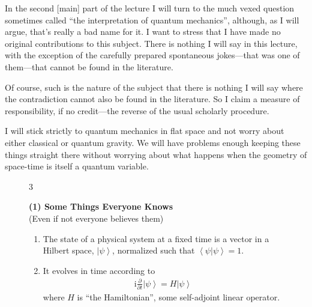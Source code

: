\documentclass[12pt,nofootinbib]{revtex4}
\newcommand{\braket}[2]{\left\langle #1 | #2 \right\rangle}
\newcommand{\ket}[1]{\left|#1\right\rangle}
\renewcommand{\i}{\text{i}}
\begin{document}
In the second [main] part of the lecture I will turn to the much vexed question sometimes called ``the interpretation of quantum mechanics'', although, as I will argue, that's really a bad name for it. I want to stress that I have made no original contributions to this subject. There is nothing I will say in this lecture, with the exception of the carefully prepared spontaneous jokes---that was one of them---that cannot be found in the literature.

Of course, such is the nature of the subject that there is nothing I will say where the contradiction cannot also be found in the literature. So I claim a measure of responsibility, if no credit---the reverse of the usual scholarly procedure.

I will stick strictly to quantum mechanics in flat space and not worry about either classical or quantum gravity. We will have problems enough keeping these things straight there without worrying about what happens when the geometry of space-time is itself a quantum variable.

\begin{figure}[htb] 
\begin{mdframed}
  \vspace{5pt}\hfill 3\\[-18pt]
  \begin{center}
    \textbf{(1) Some Things Everyone Knows}\\[4pt]
    (Even if not everyone believes them)
  \end{center}
  \begin{enumerate}[label=(\roman*)]
  \item The state of a physical system at a fixed time is a vector in a Hilbert space, $\ket{\psi}$, normalized such that $\braket{\psi}{\psi}=1$.
  \item It evolves in time according to
    \begin{align}
      \nonumber
      \i\frac{\partial}{\partial t}\ket{\psi} = H\ket{\psi}
    \end{align}
    where $H$ is ``the Hamiltonian'', some self-adjoint linear operator.
  \end{enumerate}
  \vspace{6pt}
\end{mdframed}
\end{figure}
\end{document}
